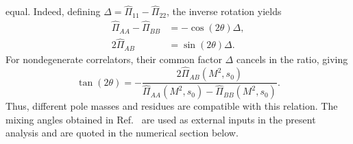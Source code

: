 equal. Indeed, defining
$\Delta=\widehat\Pi_{11}-\widehat\Pi_{22}$, the inverse rotation yields
\begin{align}
 \widehat\Pi_{AA}-\widehat\Pi_{BB}&=-\cos(2\theta)\Delta,
 \nonumber\\
 2\widehat\Pi_{AB}&=\sin(2\theta)\Delta.
 \label{eq:r1-angle-inverse}
\end{align}
For nondegenerate correlators, their common factor $\Delta$ cancels in
the ratio, giving
\begin{equation}
 \tan(2\theta)=
 -\frac{2\widehat\Pi_{AB}(M^2,s_0)}
 {\widehat\Pi_{AA}(M^2,s_0)-\widehat\Pi_{BB}(M^2,s_0)}.
 \label{eq:r1-angle-sumrule}
\end{equation}
Thus, different pole masses and residues are compatible with this relation.
The mixing angles obtained in Ref.~\cite{Aliev:2025mixing} are used as external
inputs in the present analysis and are quoted in the numerical section below.
